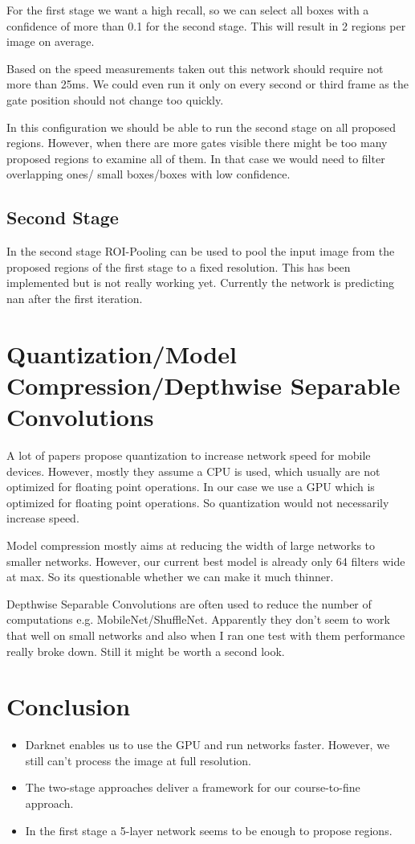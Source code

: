\documentclass{article}
\begin{document}
For the first stage we want a high recall, so we can select all boxes with a confidence of more than 0.1 for the second stage. This will result in 2 regions per image on average. 

Based on the speed measurements taken out this network should require not more than 25ms. We could even run it only on every second or third frame as the gate position should not change too quickly.

In this configuration we should be able to run the second stage on all proposed regions. However, when there are more gates visible there might be too many proposed regions to examine all of them. In that case we would need to filter overlapping ones/ small boxes/boxes with low confidence.

\subsection{Second Stage}

In the second stage ROI-Pooling can be used to pool the input image from the proposed regions of the first stage to a fixed resolution. This has been implemented but is not really working yet. Currently the network is predicting nan after the first iteration.


\section{Quantization/Model Compression/Depthwise Separable Convolutions}

A lot of papers propose quantization to increase network speed for mobile devices. However, mostly they assume a CPU is used, which usually are not optimized for floating point operations. In our case we use a GPU which is optimized for floating point operations. So quantization would not necessarily increase speed.

Model compression mostly aims at reducing the width of large networks to smaller networks. However, our current best model is already only 64 filters wide at max. So its questionable whether we can make it much thinner.

Depthwise Separable Convolutions are often used to reduce the number of computations e.g. MobileNet/ShuffleNet. Apparently they don't seem to work that well on small networks and also when I ran one test with them performance really broke down. Still it might be worth a second look.

\section{Conclusion}
\begin{itemize}
	\item Darknet enables us to use the GPU and run networks faster. However, we still can't process the image at full resolution.
	\item The two-stage approaches deliver a framework for our course-to-fine approach.
	\item In the first stage a 5-layer network seems to be enough to propose regions.
\end{itemize}
\end{document}
